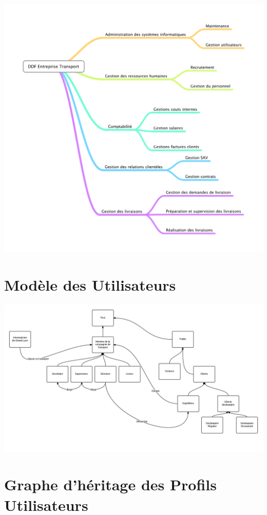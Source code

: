 \documentclass{report}
\begin{document}
\paragraph{}

\includegraphics[scale = 0.4]{images/DDF.pdf}


\section{Modèle des Utilisateurs}

\includegraphics[scale = 0.3, angle=90]{images/MU.jpeg}

\section{Graphe d'héritage des Profils Utilisateurs}
\end{document}
